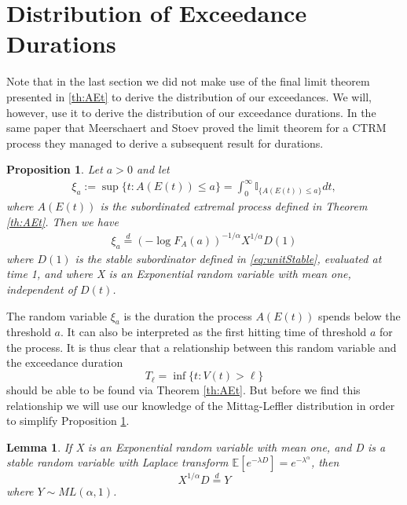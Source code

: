 \documentclass[honours,12pt]{unswthesis}
\newcommand{\E}{\mathbb{E}}
\newcommand{\1}{\mathbf 1}
\newtheorem{lemma}[equation]{Lemma}
\newtheorem{proposition}[equation]{Proposition}
\numberwithin{equation}{section}
\theoremstyle{definition}
\theoremstyle{remark}
\begin{document}
\section{Distribution of Exceedance Durations}
Note that in the last section we did not make use of the final limit theorem presented in \ref{th:AEt} to derive the distribution of our exceedances. We will, however, use it to derive the distribution of our exceedance durations. In the same paper that Meerschaert and Stoev proved the limit theorem for a CTRM process they managed to derive a subsequent result for durations.
\begin{proposition}\cite{MeerschaertStoev08}\label{prop:extremalDuration}
Let $a>0$ and let 
\begin{align}
	\xi_a:=\sup\{t:A(E(t))\leq a \} =\int^\infty_0 \mathbb{I}_{\{A(E(t))\leq a\}}dt,
\end{align}
where $A(E(t))$ is the subordinated extremal process defined in Theorem \ref{th:AEt}. Then we have
\begin{align}
	\xi_a \overset{d}{=} (-\log F_A(a))^{-1/\alpha}X^{1/\alpha}D(1)
\end{align}
where $D(1)$ is the stable subordinator defined in \ref{eq:unitStable}, evaluated at time 1, and where X is an Exponential random variable with mean one, independent of $D(t)$.
\end{proposition}
The random variable $\xi_a$ is the duration the process $A(E(t))$ spends below the threshold $a$. It can also be interpreted as the first hitting time of threshold $a$ for the process. It is thus clear that a relationship between this random variable and the exceedance duration
\[
T_\ell = \inf\{t: V(t) > \ell\}
\]
should be able to be found via Theorem \ref{th:AEt}. But before we find this relationship we will use our knowledge of the Mittag-Leffler distribution in order to simplify Proposition \ref{prop:extremalDuration}.\\
\begin{lemma}\cite{Anderson1987}
If X is an Exponential random variable with mean one, and D is a stable random variable with Laplace transform $\E[e^{-\lambda D}] = e^{-\lambda^\alpha}$, then
\[
	X^{1/\alpha}D\overset{d}{=}Y
\]
where $Y\sim ML(\alpha,1)$.
\end{lemma}
\end{document}
